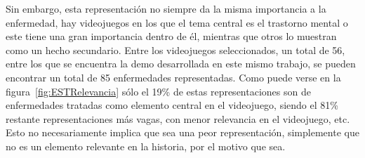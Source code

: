\documentclass[12pt, a4paper,twoside,titlepage]{book}
\begin{document}
Sin embargo, esta representación no siempre da la misma importancia a la enfermedad, hay videojuegos en los que el tema central es el trastorno mental o este tiene una gran importancia dentro de él, mientras que otros lo muestran como un hecho secundario. Entre los videojuegos seleccionados, un total de 56, entre los que se encuentra la demo desarrollada en este mismo trabajo, se pueden encontrar un total de 85 enfermedades representadas. Como puede verse en la figura~\ref{fig:ESTRelevancia} sólo el 19\% de estas representaciones son de enfermedades tratadas como elemento central en el videojuego, siendo el 81\% restante representaciones más vagas, con menor relevancia en el videojuego, etc. Esto no necesariamente implica que sea una peor representación, simplemente que no es un elemento relevante en la historia, por el motivo que sea. 
\end{document}
